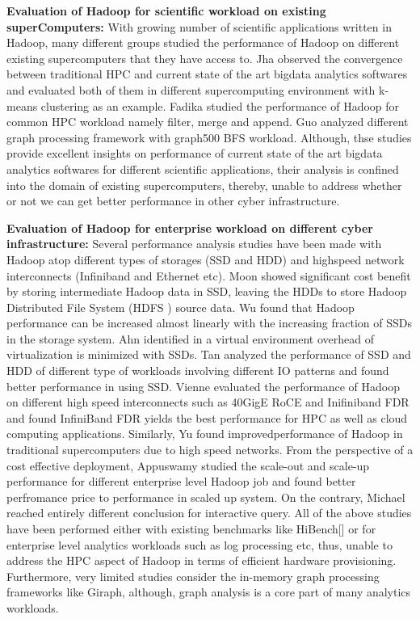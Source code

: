 \documentclass[conference]{IEEEtran}
\begin{document}
\textbf{Evaluation of Hadoop for scientific workload on existing superComputers:}
With growing number of scientific applications written in Hadoop, many different groups studied the performance of Hadoop on different existing supercomputers that they have access to.
Jha \cite{schadoop:jha} observed the convergence between traditional HPC and current state of the art bigdata analytics softwares and evaluated both of them in different supercomputing environment with k-means clustering as an example.
Fadika \cite{schadoop:fadika} studied the performance of Hadoop for common HPC workload namely filter, merge and append.
Guo \cite{scgraph:guo} analyzed different graph processing framework with graph500 \cite{bm:graph500} BFS workload.
Although, thse studies provide excellent insights on performance of current state of the art bigdata analytics softwares for different scientific applications, their analysis is confined into the domain of existing supercomputers, thereby, unable to address whether or not we can get better performance in other cyber infrastructure.

\textbf{Evaluation of Hadoop for enterprise workload on different cyber infrastructure:}
Several performance analysis studies have been made with Hadoop atop different types of storages (SSD and HDD) and highspeed network interconnects (Infiniband and Ethernet etc).
Moon \cite{ssdhdd:moon} showed significant cost benefit by storing intermediate Hadoop data in SSD, leaving the HDDs to store Hadoop Distributed File System (HDFS \cite{fw:hdfs}) source data.
Wu \cite{ssdhdd:wu} found that Hadoop performance can be increased almost linearly with the increasing fraction of SSDs in the storage system.
Ahn \cite{ssdhdd:ahn} identified in a virtual environment overhead of virtualization is minimized with SSDs.
Tan \cite{ssdhdd:tan} analyzed the performance of SSD and HDD of different type of workloads involving different IO patterns and found better performance in using SSD.
Vienne \cite{ethib:vienne} evaluated the performance of Hadoop on different high speed interconnects such as 40GigE RoCE and Inifiniband FDR and found InfiniBand FDR yields the best performance for HPC as well as cloud computing applications.
Similarly, Yu \cite{ethib:yu} found improvedperformance of Hadoop in traditional supercomputers due to high speed networks.
From the perspective of a cost effective deployment, Appuswamy \cite{scaleupscaleout:appuswamy} studied the scale-out and scale-up performance for different enterprise level Hadoop job and found better perfromance price to performance in scaled up system.
On the contrary, Michael \cite{scaleupscaleout:michael} reached entirely different conclusion for interactive query.
All of the above studies have been performed either with existing benchmarks like HiBench[] or for enterprise level analytics workloads such as log processing etc, thus, unable to address the HPC aspect of Hadoop in terms of efficient hardware provisioning.
Furthermore, very limited studies consider the in-memory graph processing frameworks like Giraph, although, graph analysis is a core part of many analytics workloads.     
\end{document}
